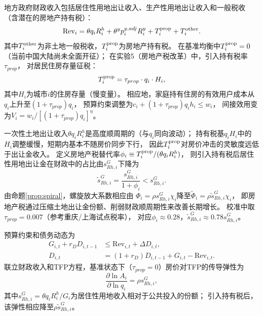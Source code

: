 \documentclass[UTF8,a4paper,12pt]{ctexart}
\theoremstyle{plain}
\theoremstyle{definition}
\theoremstyle{remark}
\newcommand{\Ry}{R^{y}}
\newcommand{\Rh}{R^{h}}
\begin{document}
地方政府财政收入包括居住性用地出让收入、生产性用地出让收入和一般税收
（含潜在的房地产持有税）：
\begin{equation}
  \text{Rev}_i=\theta q_i\Rh_i+\theta^y p_i^{y,adj}\Ry_i+T_i^{\rm prop}+T_i^{\rm other}.
  \label{eq:revenue}
\end{equation}
其中$T_i^{\rm other}$为非土地一般税收，$T_i^{\rm prop}$为房地产持有税。
在基准均衡中$T_i^{\rm prop}=0$（当前中国大陆尚未全面开征）；
在实验5（房地产税改革）中，引入持有税率$\tau_{prop}$，
对居民住房存量征税：
\begin{equation}
  T_i^{\rm prop}=\tau_{prop}\cdot q_i\cdot H_i,
  \label{eq:prop_tax}
\end{equation}
其中$H_i$为城市$i$的住房存量（慢变量）。
相应地，家庭持有住房的有效用户成本从$q_i$上升至$(1+\tau_{prop})q_i$，
预算约束调整为$c_i+(1+\tau_{prop})q_i h_i\leq w_i$，
间接效用变为$V_i=w_i/[(1+\tau_{prop})q_i]^\eta$。

一次性土地出让收入$\theta q_i\Rh_i$是高度顺周期的（与$q_i$同向波动）；
持有税基$q_i H_i$中的$H_i$调整缓慢，短期内基本不随房价同步下行，
因此$T_i^{\rm prop}$对房价冲击的灵敏度远低于出让金收入。
定义房地产税替代率$\phi_i\equiv T_i^{\rm prop}/(\theta q_i\Rh_i)$，
则引入持有税后居住性用地出让金在财政中的占比由$s_{Rh,i}^G$下降为
\begin{equation}
  \tilde{s}_{Rh,i}^G = \frac{s_{Rh,i}^G}{1+\phi_i} < s_{Rh,i}^G.
  \label{eq:prop_tax_share}
\end{equation}
由命题\ref{prop:spiral}，螺旋放大系数相应由
$\Phi_i=\rho s_{Rh,i}^G\chi_i$降至$\tilde{\Phi}_i=\rho\tilde{s}_{Rh,i}^G\chi_i$，
即房地产税通过压缩土地出让金份额、削弱财政顺周期性来改善长期增长。
校准中取$\tau_{prop}=0.007$（参考重庆/上海试点税率），
对应$\phi_i\approx 0.28$，$\tilde{s}_{Rh,i}^G\approx 0.78 s_{Rh,i}^G$。

预算约束和债务动态为
\begin{align}
  G_{i,t}+r_DD_{i,t-1}&\leq \text{Rev}_{i,t}+\Delta D_{i,t},
  \label{eq:gov_budget}\\
  D_{i,t}&=(1+r_D)D_{i,t-1}+G_{i,t}-\text{Rev}_{i,t}.
  \label{eq:debt}
\end{align}
联立财政收入和TFP方程，基准状态下（$\tau_{prop}=0$）房价对TFP的传导弹性为
\begin{equation}
  \frac{\partial\ln A_i}{\partial\ln q_i}=\rho s_{Rh,i}^G,
  \label{eq:tfp_q_elas}
\end{equation}
其中$s_{Rh,i}^G=\theta q_i\Rh_i/G_i$为居住性用地收入相对于公共投入的份额；
引入持有税后，该弹性相应降至$\rho\tilde{s}_{Rh,i}^G$。
\end{document}
